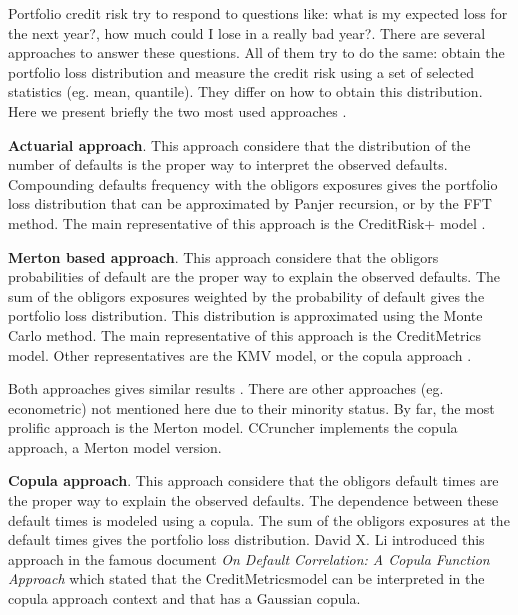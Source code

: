 \documentclass[11pt,fleqn]{book} %
\begin{document}
Portfolio credit risk try to respond to questions like: what is my 
expected loss for the next year?, how much could I lose in a really 
bad year?. There are several approaches to answer these questions. 
All of them try to do the same: obtain the portfolio loss distribution
and measure the credit risk using a set of selected statistics (eg. mean, 
quantile). They differ on how to obtain this distribution. Here we present 
briefly the two most used approaches \cite{crouhy:2000} \cite{bluhm:2002}.

\textbf{Actuarial approach}. This approach considere that the distribution of 
the number of defaults is the proper way to interpret the observed defaults.
Compounding defaults frequency with the obligors exposures gives the portfolio 
loss distribution that can be approximated by Panjer recursion, 
or by the FFT method. The main representative of this approach is the 
CreditRisk+ model \cite{creditrisk+:1997}.

\textbf{Merton based approach}. This approach considere that the obligors 
probabilities of default are the proper way to explain the observed defaults.
The sum of the obligors exposures weighted by the probability of default 
gives the portfolio loss distribution. This distribution is approximated 
using the Monte Carlo method. The main representative of this approach is the 
CreditMetrics\texttrademark{} \cite{cmetrics:1997} 
model. Other representatives are the KMV model, or the copula 
approach  \cite{li:2000}.

Both approaches gives similar results \cite{koyluoglu:1998}.  
There are other approaches (eg. econometric) not mentioned here due to 
their minority status. By far, the most prolific approach is the Merton
model. CCruncher implements the copula approach, a Merton model version.

\textbf{Copula approach}. This approach considere that the obligors default 
times are the proper way to explain the observed defaults. The dependence 
between these default times is modeled using a copula. The sum of the 
obligors exposures at the default times gives the portfolio loss distribution.
David X. Li introduced this approach in the famous document
\emph{On Default Correlation: A Copula Function Approach} \cite{li:2000}
which stated that the CreditMetrics\texttrademark model can be interpreted 
in the copula approach context and that has a Gaussian copula.

\end{document}
